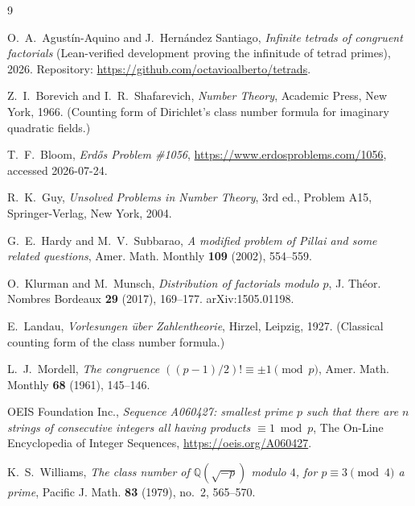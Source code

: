 \documentclass[11pt]{article}
\theoremstyle{definition}
\theoremstyle{remark}
\begin{document}
\begin{thebibliography}{9}

O.~A.~Agust\'in-Aquino and J.~Hern\'andez Santiago,
\emph{Infinite tetrads of congruent factorials} (Lean-verified development
proving the infinitude of tetrad primes),
2026. Repository: \url{https://github.com/octavioalberto/tetrads}.

Z.~I.~Borevich and I.~R.~Shafarevich,
\emph{Number Theory},
Academic Press, New York, 1966. (Counting form of Dirichlet's class number
formula for imaginary quadratic fields.)

T.~F.~Bloom,
\emph{Erd\H{o}s Problem \#1056},
\url{https://www.erdosproblems.com/1056}, accessed 2026-07-24.

R.~K.~Guy,
\emph{Unsolved Problems in Number Theory},
3rd ed., Problem A15, Springer-Verlag, New York, 2004.

G.~E.~Hardy and M.~V.~Subbarao,
\emph{A modified problem of Pillai and some related questions},
Amer. Math. Monthly \textbf{109} (2002), 554--559.

O.~Klurman and M.~Munsch,
\emph{Distribution of factorials modulo $p$},
J. Th\'eor. Nombres Bordeaux \textbf{29} (2017), 169--177.
arXiv:1505.01198.

E.~Landau,
\emph{Vorlesungen \"uber Zahlentheorie},
Hirzel, Leipzig, 1927. (Classical counting form of the class number
formula.)

L.~J.~Mordell,
\emph{The congruence $((p-1)/2)! \equiv \pm 1 \pmod p$},
Amer. Math. Monthly \textbf{68} (1961), 145--146.

OEIS Foundation Inc.,
\emph{Sequence A060427: smallest prime $p$ such that there are $n$ strings
of consecutive integers all having products $\equiv 1 \bmod p$},
The On-Line Encyclopedia of Integer Sequences,
\url{https://oeis.org/A060427}.

K.~S.~Williams,
\emph{The class number of $\mathbb{Q}(\sqrt{-p})$ modulo $4$, for
$p \equiv 3 \pmod 4$ a prime},
Pacific J. Math. \textbf{83} (1979), no.~2, 565--570.

\end{thebibliography}
\end{document}
